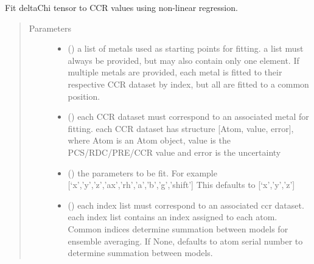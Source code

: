 \documentclass[a4paper,10pt,english,openany,oneside]{sphinxmanual}
\begin{document}
\begin{fulllineitems}
\label{\detokenize{reference/generated/paramagpy.fit.nlr_fit_metal_from_ccr:paramagpy.fit.nlr_fit_metal_from_ccr}}
Fit deltaChi tensor to CCR values using non-linear regression.
\begin{quote}\begin{description}
\item[{Parameters}] \leavevmode\begin{itemize}
\item {} 
 () \textendash{} a list of metals used as starting points for fitting.
a list must always be provided, but may also contain
only one element. If multiple metals are provided, each metal
is fitted to their respective CCR dataset by index, but all are
fitted to a common position.

\item {} 
 () \textendash{} each CCR dataset must correspond to an associated metal for fitting.
each CCR dataset has structure {[}Atom, value, error{]}, where Atom is
an Atom object, value is the PCS/RDC/PRE/CCR value
and error is the uncertainty

\item {} 
 () \textendash{} the parameters to be fit.
For example {[}‘x’,’y’,’z’,’ax’,’rh’,’a’,’b’,’g’,’shift’{]}
This defaults to {[}‘x’,’y’,’z’{]}

\item {} 
 (\sphinxstyleliteralemphasis{\sphinxupquote{, }}) \textendash{} each index list must correspond to an associated ccr dataset.
each index list contains an index assigned to each atom.
Common indices determine summation between models
for ensemble averaging.
If None, defaults to atom serial number to determine summation
between models.


\end{itemize}
\end{description}
\end{quote}
\end{fulllineitems}
\end{document}
